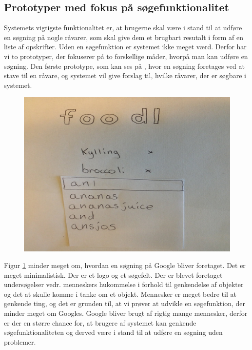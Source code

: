 \subsection{Prototyper med fokus på søgefunktionalitet}
\label{subsec:prototype1}

Systemets vigtigste funktionalitet er, at brugerne skal være i stand til at udføre en søgning på nogle råvarer, som skal give dem et brugbart resutalt i form af en liste af opskrifter. Uden en søgefunktion er systemet ikke meget værd. Derfor har vi to prototyper, der fokuserer på to forskellige måder, hvorpå man kan udføre en søgning. Den første prototype, som kan ses på , hvor en søgning foretages ved at stave til en råvare, og systemet vil give forslag til, hvilke råvarer, der er søgbare i systemet. 

\begin{figure}[H]
	\centering
	\includegraphics[scale=0.7]{billeder/prototyper/prototype1a.png}
	\label{fig:prototype1adesign}
\end{figure}

Figur \ref{fig:prototype1adesign} minder meget om, hvordan en søgning på \fx Google bliver foretaget. Det er meget minimalistisk. Der er et logo og et søgefelt. Der er blevet foretaget undersøgelser vedr. menneskers hukommelse i forhold til genkendelse af objekter og det at skulle komme i tanke om et objekt. Mennesker er meget bedre til at genkende ting, og det er grunden til, at vi prøver at udvikle en søgefunktion, der minder meget om Googles.\cite[p. ~340]{deb} Google bliver brugt af rigtig mange mennesker, derfor er der en større chance for, at brugere af systemet kan genkende søgefunktionaliteten og derved være i stand til at udføre en søgning uden problemer.

